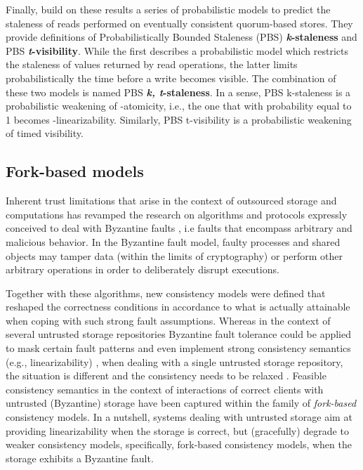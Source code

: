 \documentclass[letter, 11pt]{article}
\newcommand{\citeN}{\citet}
\renewcommand{\cite}{\citep}
\begin{document}
Finally, \citeN{Bailis.Venkataraman.ea:12} build on these results a series of
probabilistic models to predict the staleness of reads performed on eventually consistent quorum-based stores. They provide definitions of Probabilistically Bounded Staleness (PBS) \textbf{\emph{k}-staleness} and PBS \textbf{\emph{t}-visibility}. 
While the first describes a probabilistic model which restricts the staleness of values returned by read operations, the latter limits probabilistically the time before a write becomes visible. The combination of these two models is named PBS \textbf{\emph{k, t}-staleness}.
In a sense, PBS k-staleness is a probabilistic weakening of -atomicity, i.e., the one that with probability equal to 1 becomes -linearizability. Similarly, PBS t-visibility is a probabilistic weakening of timed visibility.





\subsection{Fork-based models}
\label{subsec:fork}



Inherent trust limitations that arise in the context of outsourced storage and computations \cite{Cachin.Keidar.ea:09,Vukolic:10} has revamped the  research on algorithms and protocols expressly  conceived to deal with Byzantine faults \cite{Lamport.ea:82}, 
i.e faults that encompass arbitrary and malicious behavior. In the Byzantine fault model, 
faulty processes and shared objects may tamper data (within the limits of cryptography) or perform other arbitrary 
operations in order to deliberately disrupt executions.

Together with these algorithms, new consistency models were defined that reshaped the 
correctness conditions in accordance to what is actually attainable when coping 
with such strong fault assumptions. Whereas in the context of several untrusted storage repositories Byzantine fault tolerance could be applied to mask certain fault patterns \cite{Vukolic:10,Bessani.Correia.ea:13} and even implement strong consistency semantics (e.g., linearizability) \cite{Bessani.Mendes.ea:14,Dobre.ea:14}, when dealing with a single untrusted storage repository, the situation is different and the consistency needs to be relaxed \cite{Cachin.Keidar.ea:09}. Feasible consistency semantics in the context of interactions of correct clients with untrusted (Byzantine) storage have been captured within the family of \emph{fork-based} consistency models. In a nutshell, systems dealing with untrusted storage aim at providing linearizability when the storage is correct, but (gracefully) degrade to weaker consistency models, specifically, fork-based consistency models, when the storage exhibits a Byzantine fault.
\end{document}
